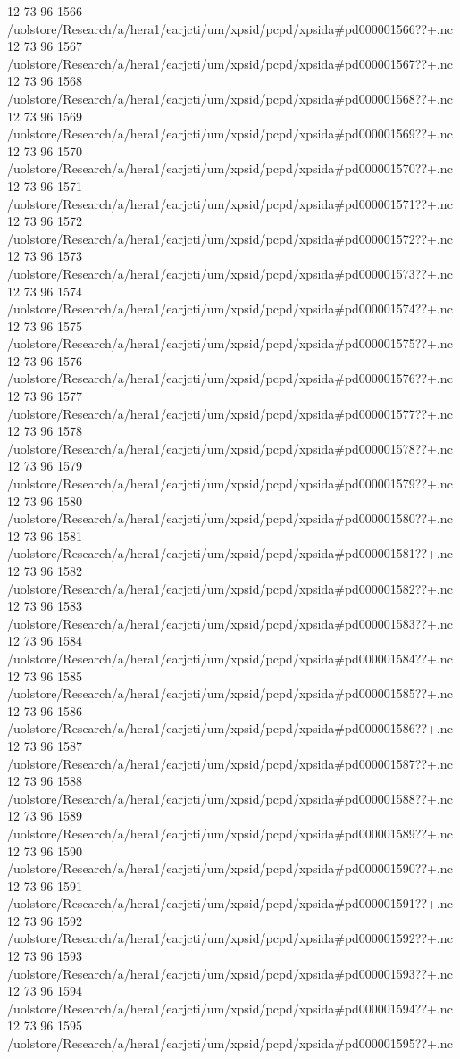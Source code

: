 12 73 96
1566
/uolstore/Research/a/hera1/earjcti/um/xpsid/pcpd/xpsida#pd000001566??+.nc
12 73 96
1567
/uolstore/Research/a/hera1/earjcti/um/xpsid/pcpd/xpsida#pd000001567??+.nc
12 73 96
1568
/uolstore/Research/a/hera1/earjcti/um/xpsid/pcpd/xpsida#pd000001568??+.nc
12 73 96
1569
/uolstore/Research/a/hera1/earjcti/um/xpsid/pcpd/xpsida#pd000001569??+.nc
12 73 96
1570
/uolstore/Research/a/hera1/earjcti/um/xpsid/pcpd/xpsida#pd000001570??+.nc
12 73 96
1571
/uolstore/Research/a/hera1/earjcti/um/xpsid/pcpd/xpsida#pd000001571??+.nc
12 73 96
1572
/uolstore/Research/a/hera1/earjcti/um/xpsid/pcpd/xpsida#pd000001572??+.nc
12 73 96
1573
/uolstore/Research/a/hera1/earjcti/um/xpsid/pcpd/xpsida#pd000001573??+.nc
12 73 96
1574
/uolstore/Research/a/hera1/earjcti/um/xpsid/pcpd/xpsida#pd000001574??+.nc
12 73 96
1575
/uolstore/Research/a/hera1/earjcti/um/xpsid/pcpd/xpsida#pd000001575??+.nc
12 73 96
1576
/uolstore/Research/a/hera1/earjcti/um/xpsid/pcpd/xpsida#pd000001576??+.nc
12 73 96
1577
/uolstore/Research/a/hera1/earjcti/um/xpsid/pcpd/xpsida#pd000001577??+.nc
12 73 96
1578
/uolstore/Research/a/hera1/earjcti/um/xpsid/pcpd/xpsida#pd000001578??+.nc
12 73 96
1579
/uolstore/Research/a/hera1/earjcti/um/xpsid/pcpd/xpsida#pd000001579??+.nc
12 73 96
1580
/uolstore/Research/a/hera1/earjcti/um/xpsid/pcpd/xpsida#pd000001580??+.nc
12 73 96
1581
/uolstore/Research/a/hera1/earjcti/um/xpsid/pcpd/xpsida#pd000001581??+.nc
12 73 96
1582
/uolstore/Research/a/hera1/earjcti/um/xpsid/pcpd/xpsida#pd000001582??+.nc
12 73 96
1583
/uolstore/Research/a/hera1/earjcti/um/xpsid/pcpd/xpsida#pd000001583??+.nc
12 73 96
1584
/uolstore/Research/a/hera1/earjcti/um/xpsid/pcpd/xpsida#pd000001584??+.nc
12 73 96
1585
/uolstore/Research/a/hera1/earjcti/um/xpsid/pcpd/xpsida#pd000001585??+.nc
12 73 96
1586
/uolstore/Research/a/hera1/earjcti/um/xpsid/pcpd/xpsida#pd000001586??+.nc
12 73 96
1587
/uolstore/Research/a/hera1/earjcti/um/xpsid/pcpd/xpsida#pd000001587??+.nc
12 73 96
1588
/uolstore/Research/a/hera1/earjcti/um/xpsid/pcpd/xpsida#pd000001588??+.nc
12 73 96
1589
/uolstore/Research/a/hera1/earjcti/um/xpsid/pcpd/xpsida#pd000001589??+.nc
12 73 96
1590
/uolstore/Research/a/hera1/earjcti/um/xpsid/pcpd/xpsida#pd000001590??+.nc
12 73 96
1591
/uolstore/Research/a/hera1/earjcti/um/xpsid/pcpd/xpsida#pd000001591??+.nc
12 73 96
1592
/uolstore/Research/a/hera1/earjcti/um/xpsid/pcpd/xpsida#pd000001592??+.nc
12 73 96
1593
/uolstore/Research/a/hera1/earjcti/um/xpsid/pcpd/xpsida#pd000001593??+.nc
12 73 96
1594
/uolstore/Research/a/hera1/earjcti/um/xpsid/pcpd/xpsida#pd000001594??+.nc
12 73 96
1595
/uolstore/Research/a/hera1/earjcti/um/xpsid/pcpd/xpsida#pd000001595??+.nc
